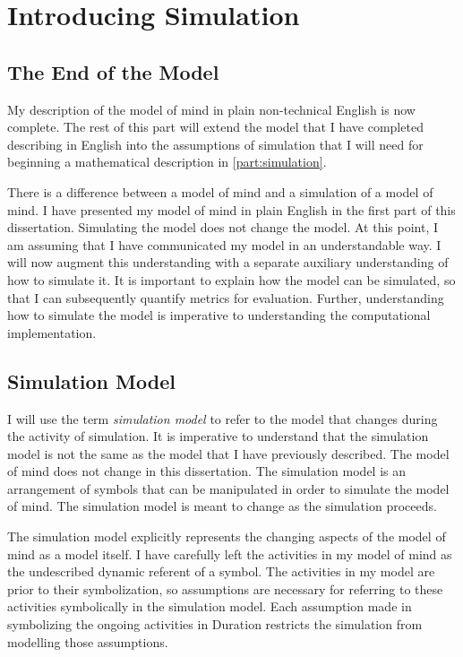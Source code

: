 \chapter{Introducing Simulation}
\label{chapter:introducing_simulation}

\section{The End of the Model}

My description of the model of mind in plain non-technical English is
now complete.  The rest of this part will extend the model that I have
completed describing in English into the assumptions of simulation
that I will need for beginning a mathematical description in
\autoref{part:simulation}.

There is a difference between a model of mind and a simulation of a
model of mind.  I have presented my model of mind in plain English in
the first part of this dissertation.  Simulating the model does not
change the model.  At this point, I am assuming that I have
communicated my model in an understandable way.  I will now augment
this understanding with a separate auxiliary understanding of how to
simulate it.  It is important to explain how the model can be
simulated, so that I can subsequently quantify metrics for evaluation.
Further, understanding how to simulate the model is imperative to
understanding the computational implementation.

\section{Simulation Model}

I will use the term \emph{simulation model} to refer to the model that
changes during the activity of simulation.  It is imperative to
understand that the simulation model is not the same as the model that
I have previously described.  The model of mind does not change in
this dissertation.  The simulation model is an arrangement of symbols
that can be manipulated in order to simulate the model of mind.  The
simulation model is meant to change as the simulation proceeds.

The simulation model explicitly represents the changing aspects of the
model of mind as a model itself.  I have carefully left the activities
in my model of mind as the undescribed dynamic referent of a symbol.
The activities in my model are prior to their symbolization, so
assumptions are necessary for referring to these activities
symbolically in the simulation model.  Each assumption made in
symbolizing the ongoing activities in Duration restricts the
simulation from modelling those assumptions.

